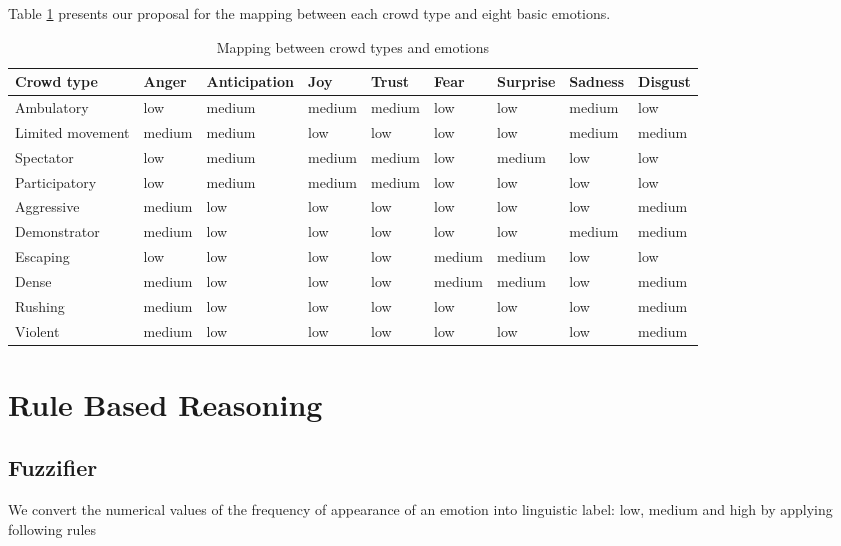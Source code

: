 Table \ref{table:mappingEmotionCrowdType} presents our proposal for the mapping between each crowd type and eight basic emotions.
\begin{table}

\caption{Mapping between crowd types and emotions}
\label{table:mappingEmotionCrowdType}
\begin{tabular}{|p{2cm}|p{1.2cm}|p{1.2cm}|p{1.2cm}|p{1.2cm}|p{1.2cm}|p{1.2cm}|p{1.2cm}|p{1.2cm}|}
\hline
\textbf{Crowd type}	& \textbf{Anger}	& \textbf{Anticipation}	& \textbf{Joy} 	& \textbf{Trust}	& \textbf{Fear}	& \textbf{Surprise}	& \textbf{Sadness}	& \textbf{Disgust}	\\
\hline
Ambulatory			& low 				& medium				& medium		& medium			& low 			& low 				& medium			& low 		\\
\hline
Limited movement	& medium			& medium				& low 			& low 				& low 			& low 				& medium			& medium	\\
\hline
Spectator			& low 				& medium				& medium		& medium 			& low 			& medium			& low 				& low 		\\
\hline
Participatory		& low 				& medium				& medium		& medium			& low 			& low 				& low 				& low 		\\
\hline
Aggressive			& medium			& low 					& low 			& low 				& low 			& low 				& low 				& medium	\\
\hline
Demonstrator		& medium			& low 					& low 			& low 				& low 			& low 				& medium			& medium	\\
\hline
Escaping			& low 				& low 					& low 			& low 				& medium		& medium			& low 				& low 		\\
\hline
Dense				& medium			& low 					& low 			& low 				& medium		& medium			& low 				& medium	\\
\hline
Rushing				& medium			& low 					& low 			& low 				& low 			& low 				& low 				& medium	\\
\hline
Violent				& medium			& low 					& low 			& low 				& low 			& low 				& low 				& medium	\\
\hline
\end{tabular}
\end{table}

\section{Rule Based Reasoning}

\subsection{Fuzzifier}
We convert the numerical values of the frequency of appearance of an emotion into linguistic label: low, medium and high by applying following rules

